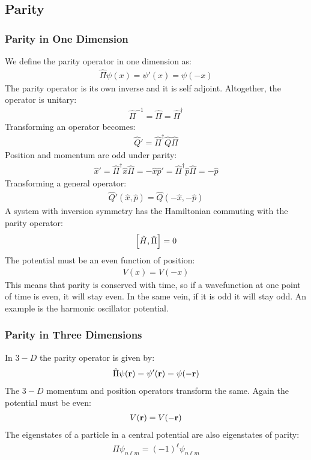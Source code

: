 \subsection{Parity}
\subsubsection{Parity in One Dimension}
We define the parity operator in one dimension as:
\begin{align*}
  \hat{\Pi}\psi(x)=\psi'(x)=\psi(-x)
\end{align*}
The parity operator is its own inverse and it is self adjoint. Altogether, the operator is unitary:
\begin{align*}
  \hat{\Pi}^{-1}=\hat{\Pi}=\hat{\Pi}^\dag
\end{align*}
Transforming an operator becomes:
\begin{align*}
  \hat{Q}'=\hat{\Pi}^\dag\hat{Q}\hat{\Pi}
\end{align*}
Position and momentum are odd under parity:
\begin{align*}
  \hat{x}'=\hat{\Pi}^\dag\hat{x}\hat{\Pi}=-\hat{x}
  \hat{p}'=\hat{\Pi}^\dag\hat{p}\hat{\Pi}=-\hat{p}
\end{align*}
Transforming a general operator:
\begin{align*}
  \hat{Q}'(\hat{x},\hat{p})=\hat{Q}(-\hat{x},-\hat{p})
\end{align*}
A system with inversion symmetry has the Hamiltonian commuting with the parity operator:
\begin{align*}
  \comm{\hat{H}}{\hat{\Pi}}=0
\end{align*}
The potential must be an even function of position:
\begin{align*}
  V(x)=V(-x)
\end{align*}
This means that parity is conserved with time, so if a wavefunction at one point of time is even, it will stay even. In the same vein, if it is odd it will stay odd. An example is the harmonic oscillator potential. 
\subsubsection{Parity in Three Dimensions}
In $3-D$ the parity operator is given by:
\begin{align*}
  \hat{\Pi}\psi(\vb{r})=\psi'(\vb{r})=\psi(-\vb{r})
\end{align*}
The $3-D$ momentum and position operators transform the same. Again the potential must be even:
\begin{align*}
  V(\vb{r})=V(-\vb{r})
\end{align*}
The eigenstates of a particle in a central potential are also eigenstates of parity:
\begin{align*}
  \hat{\Pi}\psi_{n\ell m}=(-1)^\ell\psi_{n\ell m}
\end{align*}
